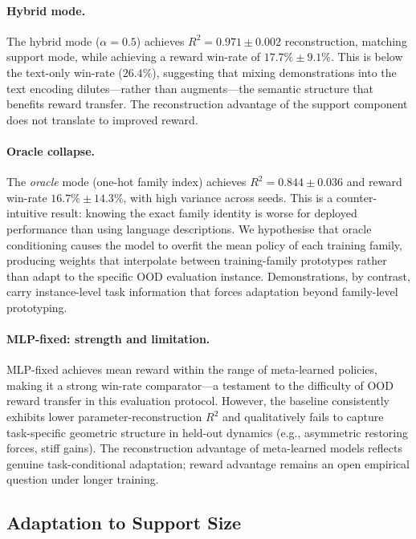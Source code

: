 \paragraph{Hybrid mode.}
The hybrid mode ($\alpha = 0.5$) achieves $R^2 = 0.971\pm0.002$ reconstruction,
matching support mode, while achieving a reward win-rate of $17.7\%\pm9.1\%$.
This is below the text-only win-rate ($26.4\%$), suggesting that mixing demonstrations
into the text encoding dilutes---rather than augments---the semantic structure that
benefits reward transfer.
The reconstruction advantage of the support component does not translate to improved reward.

\paragraph{Oracle collapse.}
The \emph{oracle} mode (one-hot family index) achieves $R^2 = 0.844\pm0.036$ and
reward win-rate $16.7\%\pm14.3\%$, with high variance across seeds.
This is a counter-intuitive result: knowing the exact family identity is worse for
deployed performance than using language descriptions.
We hypothesise that oracle conditioning causes the model to overfit the mean policy of
each training family, producing weights that interpolate between training-family prototypes
rather than adapt to the specific OOD evaluation instance.
Demonstrations, by contrast, carry instance-level task information that forces adaptation
beyond family-level prototyping.

\paragraph{MLP-fixed: strength and limitation.}
MLP-fixed achieves mean reward within the range of meta-learned policies,
making it a strong win-rate comparator---a testament to the difficulty of OOD reward transfer
in this evaluation protocol.
However, the baseline consistently exhibits lower parameter-reconstruction $R^2$
and qualitatively fails to capture task-specific geometric structure in held-out dynamics
(e.g., asymmetric restoring forces, stiff gains).
The reconstruction advantage of meta-learned models reflects genuine task-conditional
adaptation; reward advantage remains an open empirical question under longer training.

\subsection{Adaptation to Support Size}

